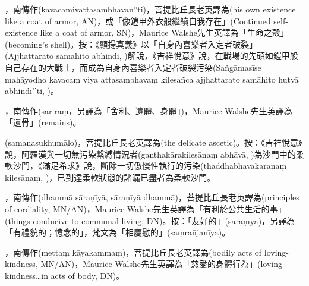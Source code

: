 \startitemgroup[noteitems]
\item{}，南傳作(kavacamivattasambhavan”ti)，菩提比丘長老英譯為(his own existence like a coat of armor, AN)，或「像鎧甲外衣般繼續自我存在」(Continued self-existence like a coat of armor, SN)，Maurice Walshe先生英譯為「生命之殼」(becoming's shell)。按：《顯揚真義》以「自身內喜樂者入定者破裂」(Ajjhattarato samāhito abhindi, )解說，《吉祥悅意》說，在戰場的先頭如鎧甲般自己存在的大戰士，而成為自身內喜樂者入定者破裂污染(Saṅgāmasīse mahāyodho kavacaṃ viya attasambhavaṃ kilesañca ajjhattarato samāhito hutvā abhindī’’ti, )。
\stopitemgroup

\startitemgroup[noteitems]
\item{}，南傳作(sarīraṃ，另譯為「舍利、遺體、身體」)，Maurice Walshe先生英譯為「遺骨」(remains)。
\stopitemgroup

\startitemgroup[noteitems]
\item{}(samaṇasukhumālo)，菩提比丘長老英譯為(the delicate ascetic)。按：《吉祥悅意》說，阿羅漢與一切無污染繫縛情況者(ganthakārakilesānaṃ abhāvā, )為沙門中的柔軟沙門，《滿足希求》說，斷除一切傲慢性執行的污染(thaddhabhāvakarānaṃ kilesānaṃ, )，已到達柔軟狀態的諸漏已盡者為柔軟沙門。
\stopitemgroup

\startitemgroup[noteitems]
\item{}，南傳作(dhammā sāraṇīyā, sāraṇīyā dhammā)，菩提比丘長老英譯為(principles of cordiality, MN/AN)，Maurice Walshe先生英譯為「有利於公共生活的事」(things conducive to communal living, DN)。按：「友好的」(sāraṇīya)，另譯為「有禮貌的；憶念的」，梵文為「相慶慰的」(saṃrañjanīya)。
\stopitemgroup

\startitemgroup[noteitems]
\item{}，南傳作(mettaṃ kāyakammaṃ)，菩提比丘長老英譯為(bodily acts of loving-kindness, MN/AN)，Maurice Walshe先生英譯為「慈愛的身體行為」(loving-kindness…in acts of body, DN)。
\stopitemgroup

